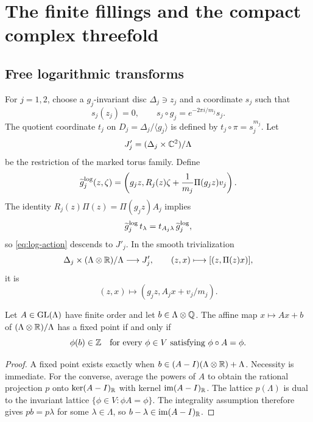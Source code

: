 \section{The finite fillings and the compact complex threefold}

\subsection{Free logarithmic transforms}
For $j=1,2$, choose a $g_j$-invariant disc $\Delta_j\ni z_j$ and a
coordinate $s_j$ such that
\[
 s_j(z_j)=0,
 \qquad
 s_j\circ g_j=e^{-2\pi i/m_j}s_j.
\]
The quotient coordinate $t_j$ on $D_j=\Delta_j/\langle g_j\rangle$ is
defined by $t_j\circ\pi=s_j^{m_j}$.  Let
\[
 J'_j=(\Delta_j\times\mathbb C^2)/\Lambda
\]
be the restriction of the marked torus family.  Define
\begin{equation}\label{eq:log-action}
 \widetilde g_j^{\mathrm{log}}(z,\zeta)
 =\left(g_jz,R_j(z)\zeta+\frac1{m_j}\Pi(g_jz)v_j\right).
\end{equation}
The identity
$R_j(z)\Pi(z)=\Pi(g_jz)A_j$ implies
\[
 \widetilde g_j^{\mathrm{log}}\,t_\lambda
 =t_{A_j\lambda}\,\widetilde g_j^{\mathrm{log}},
\]
so \eqref{eq:log-action} descends to $J'_j$.  In the smooth
trivialization
\[
 \Delta_j\times(\Lambda\otimes\mathbb R)/\Lambda\longrightarrow J'_j,
 \qquad (z,x)\longmapsto[(z,\Pi(z)x)],
\]
it is
\begin{equation}\label{eq:log-action-flat}
 (z,x)\longmapsto(g_jz,A_jx+v_j/m_j).
\end{equation}

\begin{lemma}\label{lem:affine-fixed}
Let $A\in\operatorname{GL}(\Lambda)$ have finite order and let $b\in\Lambda\otimes\mathbb Q$.
The affine map $x\mapsto Ax+b$ of $(\Lambda\otimes\mathbb R)/\Lambda$ has a fixed
point if and only if
\[
 \phi(b)\in\mathbb Z
 \quad\text{for every }\phi\in V\text{ satisfying }\phi\circ A=\phi.
\]
\end{lemma}

\begin{proof}
A fixed point exists exactly when
$b\in(A-I)(\Lambda\otimes\mathbb R)+\Lambda$.  Necessity is immediate.  For the
converse, average the powers of $A$ to obtain the rational projection
$p$ onto $\ker(A-I)_\mathbb R$ with kernel $\operatorname{im}(A-I)_\mathbb R$.  The lattice
$p(\Lambda)$ is dual to the invariant lattice
$\{\phi\in V:\phi A=\phi\}$.  The integrality assumption therefore gives
$pb=p\lambda$ for some $\lambda\in\Lambda$, so
$b-\lambda\in\operatorname{im}(A-I)_\mathbb R$.
\end{proof}

